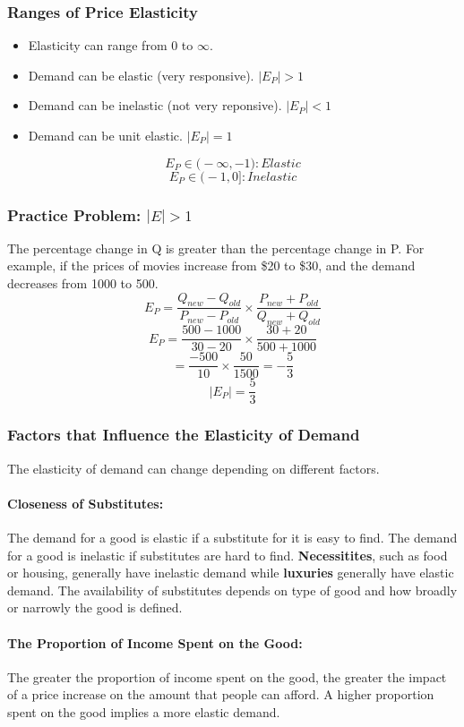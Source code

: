 \documentclass{article}
\begin{document}
\subsubsection{Ranges of Price Elasticity}
\begin{itemize}
  \item Elasticity can range from \( 0 \) to \( \infty \).
  \item Demand can be elastic (very responsive). \( |E_{P}| > 1 \)
  \item Demand can be inelastic (not very reponsive). \( |E_{P}| < 1 \)
  \item Demand can be unit elastic. \( |E_{P}| = 1 \)
\end{itemize}
\[ E_{P} \in \bigg(-\infty, -1\bigg): Elastic \]
\[ E_{P} \in \bigg(-1, 0\bigg]: Inelastic \]

\subsubsection{Practice Problem: \(|E| > 1 \)}
The percentage change in Q is greater than the percentage change in P.
For example, if the prices of movies increase from \$20 to \$30, and the demand
decreases from 1000 to 500.
\[ E_{P} = \frac{Q_{new}-Q_{old}}{P_{new}-P_{old}}\times
       \frac{P_{new}+P_{old}}{Q_{new}+Q_{old}} \]
\[ E_{P} = \frac{500-1000}{30-20}\times\frac{30+20}{500+1000} \]
\[ = \frac{-500}{10}\times\frac{50}{1500} = -\frac{5}{3} \]
\[ |E_{P}| = \frac{5}{3} \]

\subsubsection{Factors that Influence the Elasticity of Demand}
The elasticity of demand can change depending on different factors.

\paragraph{Closeness of Substitutes:} The demand for a good is elastic if a
substitute for it is easy to find. The demand for a good is inelastic if
substitutes are hard to find. \textbf{Necessitites}, such as food or housing,
generally have inelastic demand while \textbf{luxuries} generally have elastic
demand. The availability of substitutes depends on type of good and how
broadly or narrowly the good is defined.

\paragraph{The Proportion of Income Spent on the Good:}
The greater the proportion of income spent on the good, the greater the impact
of a price increase on the amount that people can afford. A higher proportion
spent on the good implies a more elastic demand.
\end{document}
